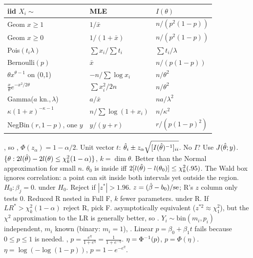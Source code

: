 {\renewcommand{\arraystretch}{1.1}%
\begin{tabular}{@{}|p{}|p{}|p{}|@{}}\hline
\rowcolor{hdr}iid $X_i\sim$&MLE&$I(\theta)$\\\hline
Geom $x\ge1$&$1/\bar x$&$n/(p^2(1{-}p))$\\\hline
Geom $x\ge0$&$1/(1+\bar x)$&$n/(p^2(1{-}p))$\\\hline
Pois$(t_i\lambda)$&$\sum x_i/\sum t_i$&$\sum t_i/\lambda$\\\hline
Bernoulli$(p)$&$\bar x$&$n/(p(1{-}p))$\\\hline
$\theta x^{\theta-1}$ on (0,1)&$-n/\sum\log x_i$&$n/\theta^2$\\\hline
$\frac x\theta e^{-x^2/2\theta}$&$\sum x_i^2/2n$&$n/\theta^2$\\\hline
Gamma($a$ kn.$,\lambda$)&$a/\bar x$&$na/\lambda^2$\\\hline
$\kappa(1+x)^{-\kappa-1}$&$n/\sum\log(1+x_i)$&$n/\kappa^2$\\\hline
NegBin$(r,1{-}p)$, one $y$&$y/(y+r)$&$r/(p(1{-}p)^2)$\\\hline
\end{tabular}}
\bx
{} , so , $\Phi(z_\alpha)=1-\alpha/2$. Unit vector $t$: $\hat{\theta}_i\pm z_\alpha\sqrt{[I(\hat{\theta})^{-1}]_{ii}}$. No $I$? Use $J(\hat{\theta};y)$.
\sk{} $\{\theta:2l(\hat{\theta})-2l(\theta)\le\chi^2_k(1-\alpha)\}$, $k=\dim\theta$. Better than the Normal approximation for small $n$. $\theta_0$ is inside iff $2[l(\hat{\theta})-l(\theta_0)]\le\chi^2_k(.95)$. The Wald box ignores correlation: a point can sit inside both intervals yet outside the region.
\sk{} $H_0:\beta_j=0$.  under $H_0$. Reject if $|z^*|>1.96$.
\sk{} $z=(\hat{\beta}-b_0)/\mathrm{se}$; R's $z$ column only tests 0.
\sk{} Reduced R nested in Full F, $k$ fewer parameters.  under R. If $LR^*>\chi^2_k(1-\alpha)$ reject R, pick F.
\sk{} asymptotically equivalent ($z^{*2}\approx\chi^2_1$), but the $\chi^2$ approximation to the LR is generally better, so .
\bx
{} $Y_i\sim\mathrm{bin}(m_i,p_i)$ independent, $m_i$ known (binary: $m_i=1$), . Linear $p=\beta_0+\beta_1t$ fails because $0\le p\le1$ is needed.
\sk{} , $p=\frac{e^\eta}{1+e^\eta}=\frac1{1+e^{-\eta}}$.  $\eta=\Phi^{-1}(p)$, $p=\Phi(\eta)$.  $\eta=\log(-\log(1-p))$, $p=1-e^{-e^\eta}$.
